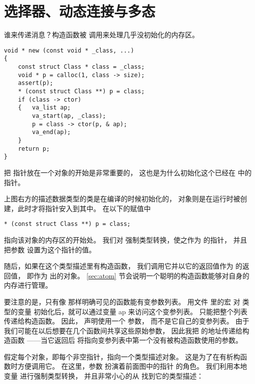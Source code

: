 \section{选择器、动态连接与多态}
\label{sec:selectDl}

谁来传递消息？构造函数被  调用来处理几乎没初始化的内存区。
\begin{lstlisting}
void * new (const void * _class, ...)
{
    const struct Class * class = _class;
    void * p = calloc(1, class -> size);
    assert(p);
    * (const struct Class **) p = class;
    if (class -> ctor)
    {   va_list ap;
        va_start(ap, _class);
        p = class -> ctor(p, & ap);
        va_end(ap);
    }
    return p;
}
\end{lstlisting}

把  指针放在一个对象的开始是非常重要的，
这也是为什么初始化这个已经在  中的指针。


上图右方的描述数据类型的类是在编译的时候初始化的，
对象则是在运行时被创建，此时才将指针安入到其中。
在以下的赋值中
\begin{lstlisting}
* (const struct Class **) p = class;
\end{lstlisting}
 指向该对象的内存区的开始处。
我们对  强制类型转换，使之作为  的指针，
并且把参数  设置为这个指针的值。

随后，如果在这个类型描述里有构造函数，
我们调用它并以它的返回值作为  的返回值，
即作为  出的对象。
\ref{sec:atom} 节会说明一个聪明的构造函数能够对自身的内存进行管理。

要注意的是，只有像  那样明确可见的函数能有变参数列表。
用文件  里的宏  对 
类型的变量  初始化后，就可以通过变量 {ap} 来访问这个变参列表。
只能把整个列表传递给构造函数。
因此， 声明使用一个  参数，
而不是它自己的变参列表。
由于我们可能在以后想要在几个函数间共享这些原始参数，
因此我把  的地址传递给构造函数
——当它返回后  将指向变参列表中第一个没有被构造函数使用的参数。

 假定每个对象，即每个非空指针，指向一个类型描述对象。
这是为了在有析构函数时方便调用它。
在这里，参数
 扮演着前面图中的指针  的角色。
我们利用本地变量  进行强制类型转换，
并且非常小心的从  找到它的类型描述：


